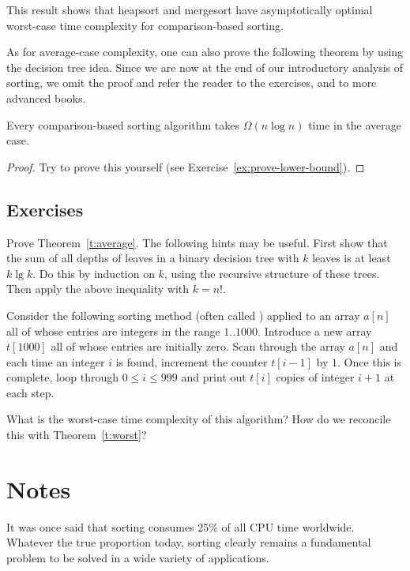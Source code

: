 This result shows that heapsort and mergesort have asymptotically optimal 
worst-case time complexity for comparison-based sorting.

As for average-case complexity, one can also prove the following
theorem by using the decision tree idea. Since we are now at the end of
our introductory analysis of sorting, we omit the proof and refer the
reader to the exercises, and to more advanced books.

\begin{Theorem}\label{t:average}
Every comparison-based sorting algorithm takes $\Omega(n \log n)$ time
in the average case. 
\end{Theorem}

\begin{proof}
Try to prove this yourself (see Exercise~\ref{ex:prove-lower-bound}).
\end{proof}
\subsection*{Exercises}

\begin{Exercise} \label{ex:prove-lower-bound} 
Prove Theorem~\ref{t:average}. The following hints may be useful. First
show that the sum of all depths of leaves in a binary decision tree with $k$
leaves is at least $k \lg k$. Do this by  induction on $k$, using the
recursive structure of these trees. Then apply the above inequality 
with $k=n!$.
\end{Exercise}

\begin{Exercise}
\label{ex:radix}
Consider the following sorting method (often called ) 
applied to an array $a[n]$ all of whose entries are integers in the range 
$1..1000$. Introduce a new array $t[1000]$ all of whose entries are initially 
zero. Scan through the array $a[n]$ and each time an integer $i$ is found, 
increment the counter $t[i-1]$ by $1$. Once this is complete, loop through 
$0 \leq i\leq 999$ and print out $t[i]$ copies of integer $i+1$ at each step.

What is the worst-case time complexity of this algorithm? How do we reconcile 
this with Theorem~\ref{t:worst}?
\end{Exercise}


\section{Notes}
It was once said that sorting consumes 25\% of all CPU time worldwide. Whatever
the true proportion today, sorting clearly remains a fundamental problem to be 
solved in a wide variety of applications.

